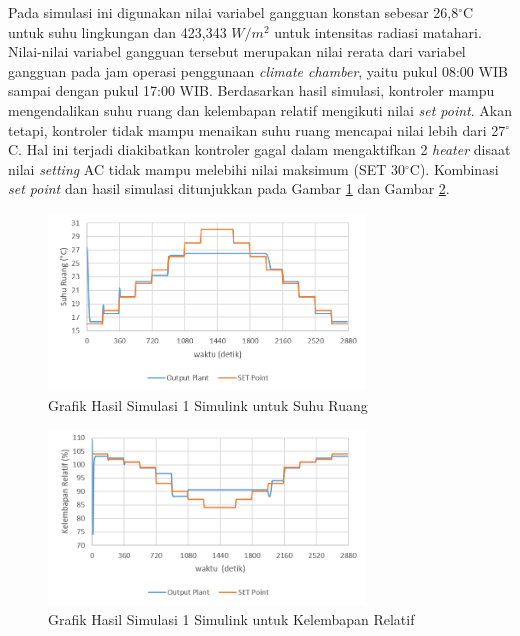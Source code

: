 Pada simulasi ini digunakan nilai variabel gangguan konstan sebesar 26,8$^\circ$C untuk suhu lingkungan dan 423,343 $W/m^2$ untuk intensitas radiasi matahari. Nilai-nilai variabel gangguan tersebut merupakan nilai rerata dari variabel gangguan pada jam operasi penggunaan \textit{climate chamber}, yaitu pukul 08:00 WIB sampai dengan pukul 17:00 WIB. Berdasarkan hasil simulasi, kontroler mampu mengendalikan suhu ruang dan kelembapan relatif mengikuti nilai \textit{set point}. Akan tetapi, kontroler tidak mampu menaikan suhu ruang mencapai nilai lebih dari 27$^\circ$C. Hal ini terjadi diakibatkan kontroler gagal dalam mengaktifkan 2 \textit{heater} disaat nilai \textit{setting} AC tidak mampu melebihi nilai maksimum (SET 30$^\circ$C). Kombinasi \textit{set point} dan hasil simulasi ditunjukkan pada Gambar \ref{fig:5:SimulinkTd} dan Gambar \ref{fig:5:SimulinkRH}.

\begin{figure}[!h]
	\centering
	\includegraphics[width=0.75\textwidth]{figures/Simulink1Td}
	\caption{Grafik Hasil Simulasi 1 Simulink untuk Suhu Ruang}
	\label{fig:5:SimulinkTd}
\end{figure}

\begin{figure}[!h]
	\centering
	\includegraphics[width=0.75\textwidth]{figures/Simulink1RH}
	\caption{Grafik Hasil Simulasi 1 Simulink untuk Kelembapan Relatif}
	\label{fig:5:SimulinkRH}
\end{figure}

